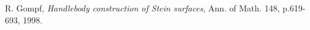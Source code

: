 \documentclass[11pt]{amsart}
\begin{document}
\begin{thebibliography}{}
\begin{comment}
\bibitem[G91]{Giroux:Convexity}
E. Giroux, \textit{Convexit\'{e} en topologie de contact}, Comment. Math. Helv. 66, p.637–677, 1991.

\bibitem[G02]{Giroux:ContactOB}
E. Giroux, \textit{G\'{e}om\'{e}trie de contact: de la dimension trois vers les dimensions sup\'{e}rieures}, Proceedings of the International Congress of Mathematicians, Vol. II, Higher Ed. Press, Beijing, p.405-414, 2002.

\bibitem[Girou17]{Giroux:IdealLiouville}
E. Giroux, \textit{Ideal Liouville Domains - a cool gadget}, J. Symplectic Geom., Volume 18, p.769–790, 2017.

\bibitem[GP17]{GirouxPardon}
E. Giroux and J. Pardon, \textit{Existence of Lefschetz fibrations on Stein and Weinstein domains}, Geom. Topol., 21, no. 2, 963–997, 2017.
\end{comment}

R. Gompf, \textit{Handlebody construction of Stein surfaces}, Ann. of Math. 148,
p.619-693, 1998.

\begin{comment}

\bibitem[GS99]{GS:KirbyCalculus}
R. Gopf and A. Stipsicz, \textit{4-manifolds and Kirby Calculus}, Graduate Studies in Mathematics 20, Amer. Math. Society, Providence, RI, 1999.

\bibitem[Gr85]{Gromov:JCurves}
M. Gromov, \textit{Pseudoholomorphic curves in symplectic manifolds}, Invent. Math, Volume 82, p.307–347, 1985.


\bibitem[G14]{Gutt:Normal}
J. Gutt, \textit{Normal Forms for Symplectic Matrices}, Portugalia Mathematicae, vol. 71, p.109-139, 2014.



\bibitem[Ha02]{Hatcher:AlgebraicTopology}
A. Hatcher, \textit{Algebraic topology}, Cambridge University Press, Cambridge, 2002.

\bibitem[HW]{HW:Cop}
N. Higstons, N. Wahl, {\em Products and coproducts in string topology}, arXiv:1709.06839v1, 2017.

\bibitem[Hi03]{Hind:Filling}
R. Hind, \textit{Stein fillings of lens spaces}, Commun. Contemp. Math. 5, no. 6, p.967–982, 2003.

\bibitem[Hof93]{Hofer:OTWeinstein}
H. Hofer, \textit{Pseudoholomorphic curves in symplectizations with applications to the Weinstein conjecture in dimension three}, Inv. Math., Volume 114, p.515-563, 1993.


\bibitem[HWZ96]{HWZ:Asymptotics}
H. Hofer, K. Wysocki and E. Zehnder, \textit{Properties of pseudoholomorphic curves in symplectizations I: Asymptotics}, Ann. Inst. H. Poincar{`e} Anal. Non Lin{`e}aire 13, p.337–37, 1996.


\end{comment}
\end{thebibliography}
\end{document}
